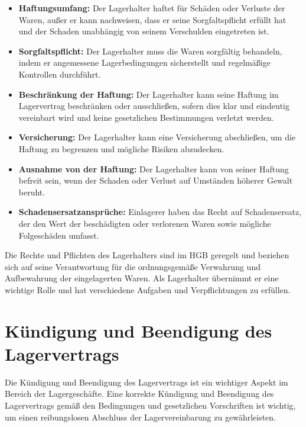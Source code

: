 \begin{itemize}
    \item \textbf{Haftungsumfang:} Der Lagerhalter haftet für Schäden oder Verluste der Waren, außer er kann nachweisen, dass er seine Sorgfaltspflicht erfüllt hat und der Schaden unabhängig von seinem Verschulden eingetreten ist.
    \item \textbf{Sorgfaltspflicht:} Der Lagerhalter muss die Waren sorgfältig behandeln, indem er angemessene Lagerbedingungen sicherstellt und regelmäßige Kontrollen durchführt.
    \item \textbf{Beschränkung der Haftung:} Der Lagerhalter kann seine Haftung im Lagervertrag beschränken oder ausschließen, sofern dies klar und eindeutig vereinbart wird und keine gesetzlichen Bestimmungen verletzt werden.
    \item \textbf{Versicherung:} Der Lagerhalter kann eine Versicherung abschließen, um die Haftung zu begrenzen und mögliche Risiken abzudecken.
    \item \textbf{Ausnahme von der Haftung:} Der Lagerhalter kann von seiner Haftung befreit sein, wenn der Schaden oder Verlust auf Umständen höherer Gewalt beruht.
    \item \textbf{Schadensersatzansprüche:} Einlagerer haben das Recht auf Schadensersatz, der den Wert der beschädigten oder verlorenen Waren sowie mögliche Folgeschäden umfasst.
\end{itemize}

Die Rechte und Pflichten des Lagerhalters sind im HGB geregelt und beziehen sich auf seine Verantwortung für die ordnungsgemäße Verwahrung und Aufbewahrung der eingelagerten Waren. Als Lagerhalter übernimmt er eine wichtige Rolle und hat verschiedene Aufgaben und Verpflichtungen zu erfüllen.

\section{Kündigung und Beendigung des Lagervertrags}
Die Kündigung und Beendigung des Lagervertrags ist ein wichtiger Aspekt im Bereich der Lagergeschäfte. Eine korrekte Kündigung und Beendigung des Lagervertrags gemäß den Bedingungen und gesetzlichen Vorschriften ist wichtig, um einen reibungslosen Abschluss der Lagervereinbarung zu gewährleisten.

